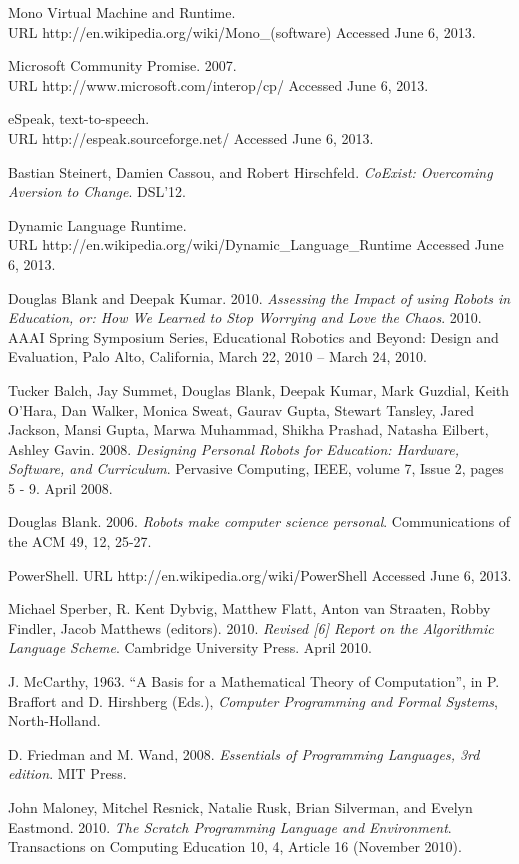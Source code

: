 \documentclass[preprint]{sigplanconf}
\begin{document}
\begin{thebibliography}{}
 Mono Virtual Machine and Runtime.\\ URL http://en.wikipedia.org/wiki/Mono\_(software) Accessed June 6, 2013.

 Microsoft Community Promise. 2007.\\
URL http://www.microsoft.com/interop/cp/ Accessed June 6, 2013.

 eSpeak, text-to-speech.\\ URL http://espeak.sourceforge.net/ Accessed June 6, 2013.

 Bastian Steinert, Damien Cassou, and
  Robert Hirschfeld. \textit{CoExist: Overcoming Aversion to
    Change}. DSL'12.

 Dynamic Language Runtime.\\ URL
  http://en.wikipedia.org/wiki/Dynamic\_Language\_Runtime Accessed
  June 6, 2013.

 Douglas Blank and Deepak
  Kumar. 2010. \textit{Assessing the Impact of using Robots in
    Education, or: How We Learned to Stop Worrying and Love the
    Chaos}. 2010. AAAI Spring Symposium Series, Educational Robotics
  and Beyond: Design and Evaluation, Palo Alto, California, March 22,
  2010 – March 24, 2010.

 Tucker Balch, Jay Summet, Douglas Blank, Deepak Kumar,
  Mark Guzdial, Keith O'Hara, Dan Walker, Monica Sweat, Gaurav Gupta,
  Stewart Tansley, Jared Jackson, Mansi Gupta, Marwa Muhammad, Shikha
  Prashad, Natasha Eilbert, Ashley Gavin. 2008. \textit{Designing
    Personal Robots for Education: Hardware, Software, and
    Curriculum}. Pervasive Computing, IEEE, volume 7, Issue 2, pages 5
  - 9. April 2008.

 Douglas Blank. 2006. \textit{Robots make computer science
  personal}. Communications of the ACM 49, 12, 25-27.

 PowerShell. URL http://en.wikipedia.org/wiki/PowerShell Accessed June 6, 2013.

 Michael Sperber, R. Kent Dybvig, Matthew
  Flatt, Anton van Straaten, Robby Findler, Jacob Matthews
  (editors). 2010. \textit{Revised [6] Report on the Algorithmic Language
  Scheme}. Cambridge University Press. April 2010.

 J. McCarthy, 1963. ``A Basis for a Mathematical Theory
  of Computation'', in P. Braffort and D. Hirshberg (Eds.),
  \emph{Computer Programming and Formal Systems}, North-Holland.

 D. Friedman and M. Wand, 2008. \emph{Essentials of
  Programming Languages, 3rd edition}. MIT Press.

 John Maloney, Mitchel Resnick, Natalie Rusk, Brian
  Silverman, and Evelyn Eastmond. 2010. \textit{The Scratch Programming
  Language and Environment}. Transactions on Computing Education 10, 4,
  Article 16 (November 2010).

\end{thebibliography}
\end{document}
